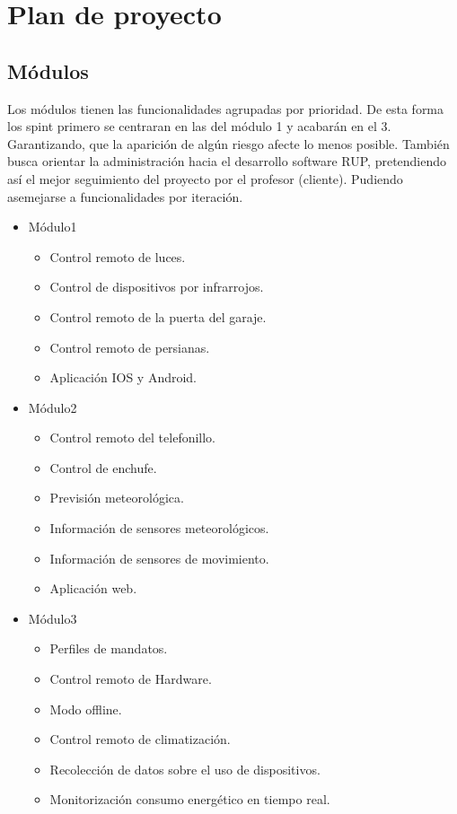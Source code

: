 \section{Plan de proyecto}
\subsection{Módulos}
Los módulos tienen las funcionalidades agrupadas por prioridad. De esta forma los spint primero se centraran en las del módulo 1 y acabarán en el 3. Garantizando, que la aparición de algún riesgo afecte lo menos posible. También busca orientar la administración hacia el desarrollo software RUP, pretendiendo así el mejor seguimiento del proyecto por el profesor (cliente). Pudiendo asemejarse a funcionalidades por iteración.
\begin{itemize}

\item Módulo1
\begin{itemize}
\item	Control remoto de luces.
\item	Control de dispositivos por infrarrojos.
\item	Control remoto de la puerta del garaje.
\item	Control remoto de persianas.
\item	Aplicación IOS y Android.
\end{itemize}

\item Módulo2
\begin{itemize}
\item	Control remoto del telefonillo.
\item	Control de enchufe.
\item	Previsión meteorológica.
\item	Información de sensores meteorológicos.
\item	Información de sensores de movimiento.
\item	Aplicación web.
\end{itemize}

\item Módulo3
\begin{itemize}
\item	Perfiles de mandatos.
\item	Control remoto de Hardware.
\item	Modo offline.
\item	Control remoto de climatización.
\item	Recolección de datos sobre el uso de dispositivos.
\item	Monitorización consumo energético en tiempo real.
\end{itemize}

\end{itemize}
